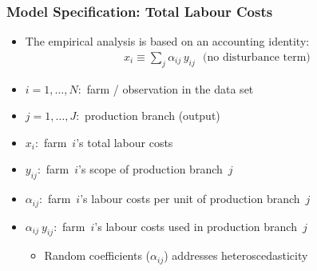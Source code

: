 \documentclass[t,24pt,aspectratio=169]{beamer}
\begin{document}
\begin{frame}[hvid]
\frametitle{\vspace{-3ex}Model Specification: Total Labour Costs}
\begin{itemize}
    \item The empirical analysis is based on an accounting identity:
    \begin{align*}
        x_{i} \equiv \sum_j \alpha_{ij} \, y_{ij} \,\,\,\, \text{(no disturbance term)}
    \end{align*}
\end{itemize}
\begin{itemize}
    \item $i=1,\ldots, N:$ farm / observation in the data set
    \item $j=1, \ldots,J:$ production branch (output)
    \item $x_i:$ farm~$i$'s total labour costs
    \item $y_{ij}:$ farm~$i$'s scope of production branch~$j$
    \item $\alpha_{ij}:$ farm~$i$'s labour costs per unit of production branch~$j$
    \item $\alpha_{ij} \:y_{ij}:$ farm~$i$'s labour costs used in production branch~$j$
    \vspace{2ex}
    \begin{itemize}
        \item[\fontsize{12pt}{14pt}\selectfont $\Rightarrow$] \fontsize{11pt}{14pt}\selectfont Random coefficients ($\alpha_{ij}$) addresses heteroscedasticity
    \end{itemize}
    \end{itemize}
\end{frame}
\end{document}
